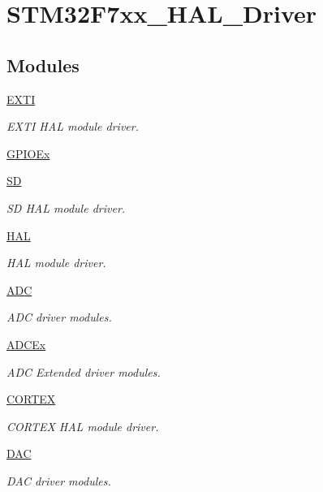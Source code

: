 \hypertarget{group___s_t_m32_f7xx___h_a_l___driver}{}\section{S\+T\+M32\+F7xx\+\_\+\+H\+A\+L\+\_\+\+Driver}
\label{group___s_t_m32_f7xx___h_a_l___driver}
\subsection*{Modules}
\begin{DoxyCompactItemize}
\item 
\mbox{\hyperlink{group___e_x_t_i}{E\+X\+TI}}
\begin{DoxyCompactList}\small\item\em E\+X\+TI H\+AL module driver. \end{DoxyCompactList}\item 
\mbox{\hyperlink{group___g_p_i_o_ex}{G\+P\+I\+O\+Ex}}
\item 
\mbox{\hyperlink{group___s_d}{SD}}
\begin{DoxyCompactList}\small\item\em SD H\+AL module driver. \end{DoxyCompactList}\item 
\mbox{\hyperlink{group___h_a_l}{H\+AL}}
\begin{DoxyCompactList}\small\item\em H\+AL module driver. \end{DoxyCompactList}\item 
\mbox{\hyperlink{group___a_d_c}{A\+DC}}
\begin{DoxyCompactList}\small\item\em A\+DC driver modules. \end{DoxyCompactList}\item 
\mbox{\hyperlink{group___a_d_c_ex}{A\+D\+C\+Ex}}
\begin{DoxyCompactList}\small\item\em A\+DC Extended driver modules. \end{DoxyCompactList}\item 
\mbox{\hyperlink{group___c_o_r_t_e_x}{C\+O\+R\+T\+EX}}
\begin{DoxyCompactList}\small\item\em C\+O\+R\+T\+EX H\+AL module driver. \end{DoxyCompactList}\item 
\mbox{\hyperlink{group___d_a_c}{D\+AC}}
\begin{DoxyCompactList}\small\item\em D\+AC driver modules. \end{DoxyCompactList}\item 

\end{DoxyCompactItemize}
